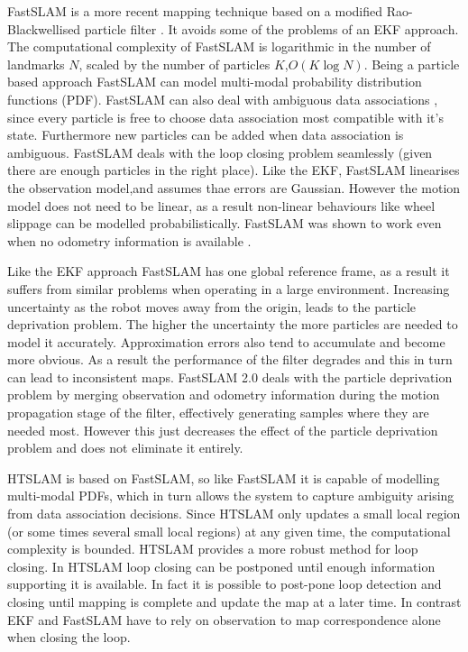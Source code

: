 
FastSLAM is a more recent mapping technique based on a modified
Rao-Blackwellised particle filter \cite{fastslam, fastslam2}. It
avoids some of the problems of an EKF approach. The computational
complexity of FastSLAM is logarithmic in the number of landmarks $N$,
scaled by the number of particles $K$,$O(K \log N)$. Being a particle
based approach FastSLAM can model multi-modal probability distribution
functions (PDF). FastSLAM can also deal with ambiguous data
associations \cite{Montemerlo2003}, since every particle is free to
choose data association most compatible with it's state. Furthermore
new particles can be added when data association is
ambiguous. FastSLAM deals with the loop closing problem seamlessly
(given there are enough particles in the right place). Like the EKF,
FastSLAM linearises the observation model,and assumes thae errors are
Gaussian. However the motion model does not need to be linear, as a result
non-linear behaviours like wheel slippage can be modelled
probabilistically. FastSLAM was shown to work even when no odometry
information is available \cite{fastslam}.

Like the EKF approach FastSLAM has one global reference frame, as a
result it suffers from similar problems when operating in a large
environment. Increasing uncertainty as the robot moves away from the
origin, leads to the particle deprivation problem. The higher the
uncertainty the more particles are needed to model it accurately.
Approximation errors also tend to accumulate and become more obvious.
As a result the performance of the filter degrades and this in turn
can lead to inconsistent maps. FastSLAM 2.0 \cite{fastslam2} deals
with the particle deprivation problem by merging observation and
odometry information during the motion propagation stage of the filter,
effectively generating samples where they are needed most. However
this just decreases the effect of the particle deprivation problem and
does not eliminate it entirely.

HTSLAM is based on FastSLAM, so like FastSLAM it is capable of
modelling multi-modal PDFs, which in turn allows the system to capture
ambiguity arising from data association decisions. Since HTSLAM
only updates a small local region (or some times several small local
regions) at any given time, the computational complexity is
bounded. HTSLAM provides a more robust method for loop closing. In
HTSLAM loop closing can be postponed until enough information
supporting it is available. In fact it is possible to post-pone loop
detection and closing until mapping is complete and update the map at
a later time. In contrast EKF and FastSLAM have to rely on observation
to map correspondence alone when closing the loop.


